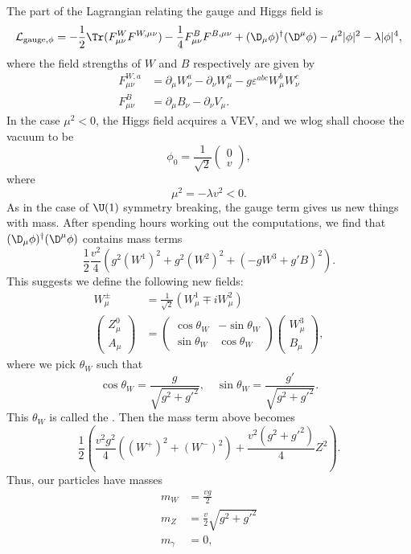 \documentclass[a4paper]{article}
\begin{document}
The part of the Lagrangian relating the gauge and Higgs field is
\[
  \mathcal{L}_{\mathrm{gauge}, \phi} = -\frac{1}{2} \Tr (F^W_{\mu\nu} F^{W,\mu\nu}) - \frac{1}{4} F_{\mu\nu}^B F^{B, \mu\nu} + (\D_\mu \phi)^\dagger (\D^\mu \phi) - \mu^2 |\phi|^2 - \lambda |\phi|^4,
\]
where the field strengths of $W$ and $B$ respectively are given by
\begin{align*}
  F_{\mu\nu}^{W, a} &= \partial_\mu W_\nu^a - \partial_\nu W_\mu^a - g \varepsilon^{abc} W_\mu^b W_\nu^c\\
  F_{\mu\nu}^B &= \partial_\mu B_\nu - \partial_\nu V_\mu.
\end{align*}
In the case $\mu^2 < 0$, the Higgs field acquires a VEV, and we wlog shall choose the vacuum to be
\[
  \phi_0 = \frac{1}{\sqrt{2}}
  \begin{pmatrix}
    0\\ v
  \end{pmatrix},
\]
where
\[
  \mu^2 = - \lambda v^2 < 0.
\]
As in the case of $\U(1)$ symmetry breaking, the gauge term gives us new things with mass. After spending hours working out the computations, we find that $(\D_\mu \phi)^\dagger (\D^\mu \phi)$ contains mass terms
\[
  \frac{1}{2} \frac{v^2}{4} \left(g^2 (W^1)^2 + g^2 (W^2)^2 + (-gW^3 + g' B)^2\right).
\]
This suggests we define the following new fields:
\begin{align*}
  W_\mu^{\pm} &= \frac{1}{\sqrt{2}} (W_\mu^1 \mp i W_\mu^2)\\
  \begin{pmatrix}
    Z_\mu^0\\
    A_\mu
  \end{pmatrix} &=
  \begin{pmatrix}
    \cos \theta_W & - \sin \theta_W\\
    \sin \theta_W & \cos \theta_W
  \end{pmatrix}
  \begin{pmatrix}
    W_\mu^3\\
    B_\mu
  \end{pmatrix},
\end{align*}
where we pick $\theta_W$ such that
\[
  \cos \theta_W = \frac{g}{\sqrt{g^2 + g'^2}},\quad \sin \theta_W = \frac{g'}{\sqrt{g^2 + g'^2}}.
\]
This $\theta_W$ is called the . Then the mass term above becomes
\[
  \frac{1}{2} \left(\frac{v^2g^2}{4} ((W^+)^2 + (W^-)^2) + \frac{v^2(g^2 + g'^2)}{4} Z^2\right).
\]
Thus, our particles have masses
\begin{align*}
  m_W &= \frac{vg}{2}\\
  m_Z &= \frac{v}{2} \sqrt{g^2 + g'^2}\\
  m_\gamma &= 0,
\end{align*}
\end{document}
